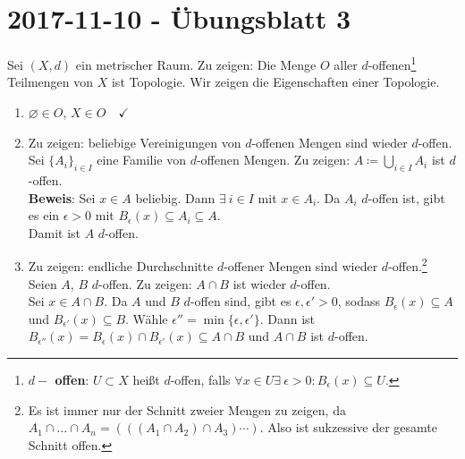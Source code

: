 \section{2017-11-10 - Übungsblatt 3}
% 
\begin{problem*}[1]
  Sei $ (X, d) $ ein metrischer Raum. Zu zeigen: Die Menge $ O $ aller $ d $-offenen\footnote{\textbf{$ d- $ offen}: $ U \subset X $ heißt $ d $-offen, falls $ \forall x \in U \exists \ \epsilon > 0 : B_\epsilon(x) \subseteq U $.} Teilmengen von $ X $ ist Topologie. Wir zeigen die Eigenschaften einer Topologie.
  \begin{enumerate}
    \item $ \varnothing \in O $, $ X \in O \quad \checkmark $
    \item Zu zeigen: beliebige Vereinigungen von $ d $-offenen Mengen sind wieder $ d $-offen. \\
      Sei $ \{ A_i \}_{ i \in I } $ eine Familie von $ d $-offenen Mengen. Zu zeigen: $ A \coloneqq \bigcup_{i \in I}A_i $ ist $ d $-offen. \\
      \textbf{Beweis}: Sei $ x \in A $ beliebig. Dann $ \exists \ i \in I $ mit $ x \in A_i $. Da $ A_i $ $ d $-offen ist, gibt es ein $ \epsilon > 0 $ mit $ B_\epsilon(x) \subseteq A_i \subseteq A $. \\
      Damit ist $ A $ $ d $-offen.
    \item Zu zeigen: endliche Durchschnitte $ d $-offener Mengen sind wieder $ d $-offen.\footnote{Es ist immer nur der Schnitt zweier Mengen zu zeigen, da $ A_1 \cap \dots \cap A_n = \left( \left( \left( A_1 \cap A_2 \right) \cap A_3 \right) \cdots \right) $. Also ist sukzessive der gesamte Schnitt offen.} \\
    Seien $ A $, $ B $ $ d $-offen. Zu zeigen: $ A \cap B $ ist wieder $ d $-offen. \\
    Sei $ x \in A \cap B $. Da $ A $ und $ B $ $ d $-offen sind, gibt es $ \epsilon, \epsilon' > 0 $, sodass $ B_\epsilon(x) \subseteq A $ und $ B_{\epsilon'}(x) \subseteq B $. Wähle $ \epsilon'' = \min\{ \epsilon, \epsilon' \} $. Dann ist $ B_{\epsilon''}(x) = B_\epsilon(x) \cap B_{\epsilon'}(x) \subseteq A \cap B $ und $ A \cap B $ ist $ d $-offen.
  \end{enumerate}
\end{problem*}

